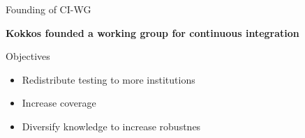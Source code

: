 


\begin{frame}[fragile]{Founding of CI-WG}
  \begin{center}
\textbf{Kokkos founded a working group for continuous integration}
\vspace{1cm}
  \end{center}

    Objectives
    \begin{itemize}
      \item{Redistribute testing to more institutions}
      \item{Increase coverage}
      \item{Diversify knowledge to increase robustnes}
    \end{itemize}

\end{frame}

